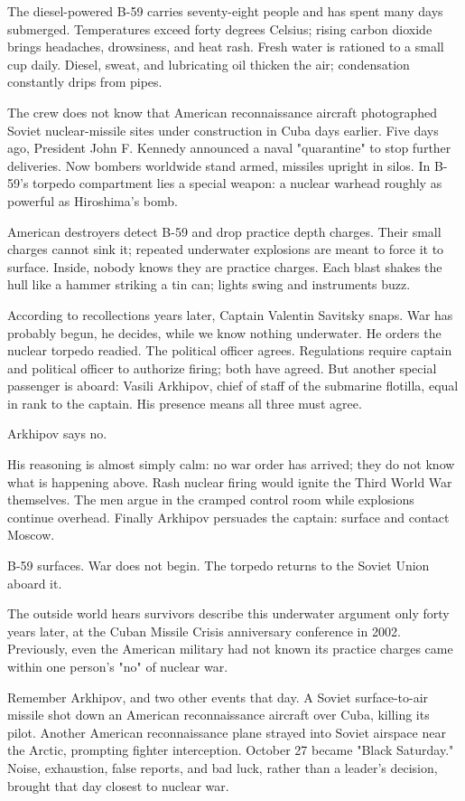 The diesel-powered B-59 carries seventy-eight people and has spent many days submerged. Temperatures exceed forty degrees Celsius; rising carbon dioxide brings headaches, drowsiness, and heat rash. Fresh water is rationed to a small cup daily. Diesel, sweat, and lubricating oil thicken the air; condensation constantly drips from pipes.

The crew does not know that American reconnaissance aircraft photographed Soviet nuclear-missile sites under construction in Cuba days earlier. Five days ago, President John F. Kennedy announced a naval "quarantine" to stop further deliveries. Now bombers worldwide stand armed, missiles upright in silos. In B-59's torpedo compartment lies a special weapon: a nuclear warhead roughly as powerful as Hiroshima's bomb.

American destroyers detect B-59 and drop practice depth charges. Their small charges cannot sink it; repeated underwater explosions are meant to force it to surface. Inside, nobody knows they are practice charges. Each blast shakes the hull like a hammer striking a tin can; lights swing and instruments buzz.

According to recollections years later, Captain Valentin Savitsky snaps. War has probably begun, he decides, while we know nothing underwater. He orders the nuclear torpedo readied. The political officer agrees. Regulations require captain and political officer to authorize firing; both have agreed. But another special passenger is aboard: Vasili Arkhipov, chief of staff of the submarine flotilla, equal in rank to the captain. His presence means all three must agree.

Arkhipov says no.

His reasoning is almost simply calm: no war order has arrived; they do not know what is happening above. Rash nuclear firing would ignite the Third World War themselves. The men argue in the cramped control room while explosions continue overhead. Finally Arkhipov persuades the captain: surface and contact Moscow.

B-59 surfaces. War does not begin. The torpedo returns to the Soviet Union aboard it.

The outside world hears survivors describe this underwater argument only forty years later, at the Cuban Missile Crisis anniversary conference in 2002. Previously, even the American military had not known its practice charges came within one person's "no" of nuclear war.

Remember Arkhipov, and two other events that day. A Soviet surface-to-air missile shot down an American reconnaissance aircraft over Cuba, killing its pilot. Another American reconnaissance plane strayed into Soviet airspace near the Arctic, prompting fighter interception. October 27 became "Black Saturday." Noise, exhaustion, false reports, and bad luck, rather than a leader's decision, brought that day closest to nuclear war.

